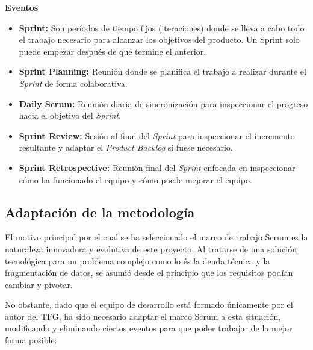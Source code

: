 \textbf{Eventos}
\begin{itemize}
    \item \textbf{Sprint:} Son períodos de tiempo fijos (iteraciones) donde se lleva a cabo todo el trabajo necesario para alcanzar los objetivos del producto. Un Sprint solo puede empezar después de que termine el anterior.
    \item \textbf{Sprint Planning:} Reunión donde se planifica el trabajo a realizar durante el \textit{Sprint} de forma colaborativa.
    \item \textbf{Daily Scrum:} Reunión diaria de sincronización para inspeccionar el progreso hacia el objetivo del \textit{Sprint}.
    \item \textbf{Sprint Review:} Sesión al final del \textit{Sprint} para inspeccionar el incremento resultante y adaptar el \textit{Product Backlog} si fuese necesario.
    \item \textbf{Sprint Retrospective:} Reunión final del \textit{Sprint} enfocada en inspeccionar cómo ha funcionado el equipo y cómo puede mejorar el equipo.
\end{itemize}

\subsection{Adaptación de la metodología} 
El motivo principal por el cual se ha seleccionado el marco de trabajo Scrum es la naturaleza innovadora y evolutiva de este proyecto. Al tratarse de una solución tecnológica para un problema complejo como lo és la deuda técnica y la fragmentación de datos, se asumió desde el principio que los requisitos podían cambiar y pivotar.

No obstante, dado que el equipo de desarrollo está formado únicamente por el autor del TFG, ha sido necesario adaptar el marco Scrum a esta situación, modificando y eliminando ciertos eventos para que poder trabajar de la mejor forma posible:

